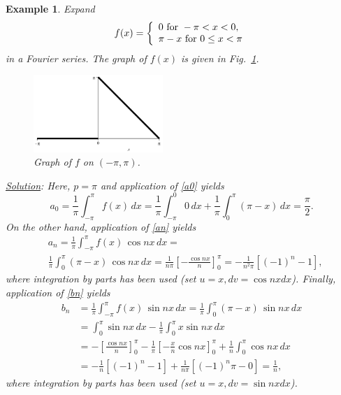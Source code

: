 \documentclass[12pt]{article}
\numberwithin{equation}{section}
\newtheorem{example}[theorem]{Example}
\begin{document}
\begin{example}
\normalfont
 Expand 
\begin{equation} \label{example}
f(x)=\left \{ \begin{array}{l}
              0 \,\,{\rm for }\,\,-\pi < x < 0,\\
              \pi-x \,\, {\rm for}\,\, 0 \le x < \pi\end{array} \right.
\end{equation}
in a Fourier series. The graph of $f(x)$ is given in Fig.~\ref{fig:fourier1}.\\
\begin{figure}[ht]
\begin{center}
\includegraphics[width=4.9cm,keepaspectratio]{Figs/saw1.jpg}
\end{center}
\caption{\small Graph of $f$ on $(-\pi,\pi)$.}
\label{fig:fourier1}
\end{figure}
\underline{Solution}:
Here, $p=\pi$ and application of \eqref{a0} yields
\[
a_0=\frac{1}{\pi}\int_{-\pi}^{\pi} f(x)\,dx=\frac{1}{\pi}\int_{-\pi}^{0}0\,dx
+\frac{1}{\pi}\int_0^{\pi}(\pi -x)\,dx =\frac{\pi}{2}.
\]
On the other hand, application of \eqref{an} yields  
\begin{align*}
&a_n=\frac{1}{\pi}\int_{-\pi}^{\pi} f(x)\,\cos nx \,dx=\\
&\frac{1}{\pi}\int_0^{\pi}(\pi -x)\,\cos nx \,dx=\frac{1}{n\pi} 
[-\frac{\cos nx}{n}]_0^{\pi} = -\frac{1}{n^2\pi} [ (-1)^n-1],
\end{align*}
where integration by parts has been used (set $u=x, dv= \cos nx dx$).
Finally, application of \eqref{bn} yields 
\begin{align*}
b_n&=\frac{1}{\pi}\int_{-\pi}^{\pi} f(x)\,\sin nx \,dx=
\frac{1}{\pi}\int_0^{\pi}(\pi -x)\,\sin nx \,dx\\
&=\int_0^{\pi} \sin nx\,dx -\frac{1}{\pi} \int_0^{\pi} x\sin nx \,dx 
\nonumber\\
&=-[\frac{\cos nx}{n}]_0^{\pi} -\frac{1}{\pi}[-\frac{x}{n}\cos nx ]_0^{\pi}
+\frac{1}{n}\int_0^{\pi} \cos nx \,dx\\
&=-\frac{1}{n}[(-1)^n-1]+\frac{1}{n\pi} [ (-1)^n\pi -0]=\frac{1}{n},
\end{align*}
where integration by parts has been used (set $u=x, dv=\sin nx dx$).


\end{example}
\end{document}
